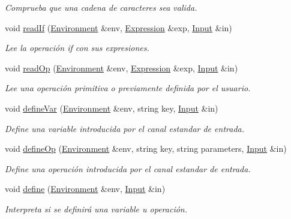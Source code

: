 \begin{DoxyCompactItemize}
\begin{DoxyCompactList}\small\item\em Comprueba que una cadena de caracteres sea valida. \end{DoxyCompactList}\item 
void \hyperlink{_functions_i_o_8hh_ae5d92549027ba3619eca48a15b567682}{read\+If} (\hyperlink{class_environment}{Environment} \&env, \hyperlink{class_expression}{Expression} \&exp, \hyperlink{class_input}{Input} \&in)
\begin{DoxyCompactList}\small\item\em Lee la operación if con sus expresiones. \end{DoxyCompactList}\item 
void \hyperlink{_functions_i_o_8hh_acb31c57a06915fe17eee64989f500f0d}{read\+Op} (\hyperlink{class_environment}{Environment} \&env, \hyperlink{class_expression}{Expression} \&exp, \hyperlink{class_input}{Input} \&in)
\begin{DoxyCompactList}\small\item\em Lee una operación primitiva o previamente definida por el usuario. \end{DoxyCompactList}\item 
void \hyperlink{_functions_i_o_8hh_a2b0504402167c389ef8c7de12d41149b}{define\+Var} (\hyperlink{class_environment}{Environment} \&env, string key, \hyperlink{class_input}{Input} \&in)
\begin{DoxyCompactList}\small\item\em Define una variable introducida por el canal estandar de entrada. \end{DoxyCompactList}\item 
void \hyperlink{_functions_i_o_8hh_a39e6424c2643bf6ddf2e5ff8a8c342e9}{define\+Op} (\hyperlink{class_environment}{Environment} \&env, string key, string parameters, \hyperlink{class_input}{Input} \&in)
\begin{DoxyCompactList}\small\item\em Define una operación introducida por el canal estandar de entrada. \end{DoxyCompactList}\item 
void \hyperlink{_functions_i_o_8hh_a65f523a256e113ca2711c3972157df26}{define} (\hyperlink{class_environment}{Environment} \&env, \hyperlink{class_input}{Input} \&in)
\begin{DoxyCompactList}\small\item\em Interpreta si se definirá una variable u operación. \end{DoxyCompactList}\item 

\end{DoxyCompactItemize}
